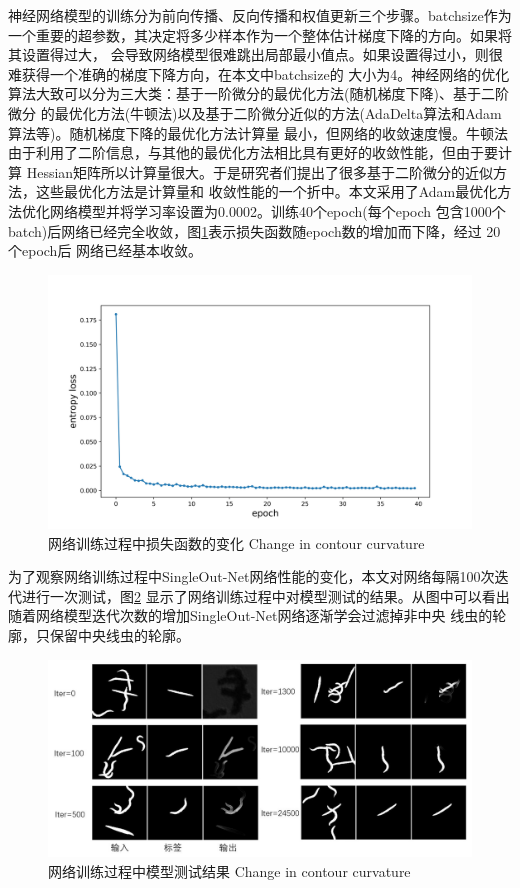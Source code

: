 	神经网络模型的训练分为前向传播、反向传播和权值更新三个步骤。batchsize作为一个重要的超参数，其决定将多少样本作为一个整体估计梯度下降的方向。如果将其设置得过大，
	会导致网络模型很难跳出局部最小值点。如果设置得过小，则很难获得一个准确的梯度下降方向，在本文中batchsize的
	大小为4。神经网络的优化算法大致可以分为三大类：基于一阶微分的最优化方法(随机梯度下降)、基于二阶微分
	的最优化方法(牛顿法)以及基于二阶微分近似的方法(AdaDelta算法\cite{zeiler2012adadelta}和Adam算法\cite{kinga2015method}等)。随机梯度下降的最优化方法计算量
	最小，但网络的收敛速度慢。牛顿法由于利用了二阶信息，与其他的最优化方法相比具有更好的收敛性能，但由于要计算
	Hessian矩阵所以计算量很大。于是研究者们提出了很多基于二阶微分的近似方法，这些最优化方法是计算量和
	收敛性能的一个折中。本文采用了Adam最优化方法优化网络模型并将学习率设置为0.0002。训练40个epoch(每个epoch
	包含1000个batch)后网络已经完全收敛，图\ref{fig:chap4:loss}表示损失函数随epoch数的增加而下降，经过 20个epoch后
	网络已经基本收敛。
	\begin{figure}[thb]
	  \centering
	  \includegraphics[width=13cm]{figure/chap4/loss.jpg}
	  \bicaption
		{网络训练过程中损失函数的变化}
		{Change in contour curvature}
	  \label{fig:chap4:loss}
	\end{figure}
	
	为了观察网络训练过程中SingleOut-Net网络性能的变化，本文对网络每隔100次迭代进行一次测试，图\ref{fig:chap4:progress}
	显示了网络训练过程中对模型测试的结果。从图中可以看出随着网络模型迭代次数的增加SingleOut-Net网络逐渐学会过滤掉非中央
	线虫的轮廓，只保留中央线虫的轮廓。
		\begin{figure}[htb]
	  \centering
	  \includegraphics[width=15cm]{figure/chap4/progress.jpg}
	  \bicaption
		{网络训练过程中模型测试结果}
		{Change in contour curvature}
	  \label{fig:chap4:progress}
	\end{figure}
